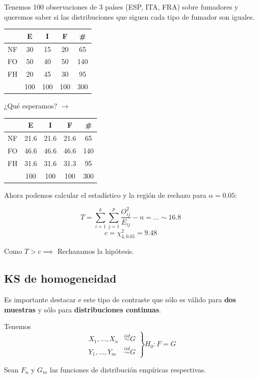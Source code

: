 

\begin{example}

Tenemos 100 observaciones de 3 países (ESP, ITA, FRA) sobre fumadores y queremos saber si las distribuciones que siguen cada tipo de fumador son iguales.

\begin{center}


\begin{tabular}{c|ccc|c}
 & E & I & F & \#\\\hline
NF&30&15&20&65\\
FO&50&40&50&140\\
FH&20&45&30&95\\\hline
&100 & 100 & 100 & 300
\end{tabular}
¿Qué esperamos? $\to$
\begin{tabular}{c|ccc|c}
 & E & I & F & \#\\\hline
NF & 21.6 & 21.6 & 21.6 & 65 \\
FO & 46.6 & 46.6 & 46.6 & 140 \\
FH & 31.6 & 31.6 & 31.3 & 95 \\
\hline
&100 & 100 & 100 & 300
\end{tabular}
\end{center}

Ahora podemos calcular el estadístico y la región de rechazo para $α=0.05$:

\[ T = \sum_{i=1}^k \sum_{j=1}^p \frac{O_{ij}^2}{E_{ij}} -n = ... \sim 16.8\]
\[ c = \chi^2_{4,0.05} = 9.48\]

Como $T > c \implies $ Rechazamos la hipótesis.

\end{example}

\subsection{KS de homogeneidad}

Es importante destacar e este tipo de contraste que sólo es válido para \textbf{dos muestras} y sólo para \textbf{distribuciones continuas}.

Tenemos \[
\left.
\begin{array}{cc}
X_{1} ,...,X_{n} &\overset{iid}{\sim} G\\ 
Y_{1} ,...,Y_m &\overset{iid}{\sim}G
\end{array} \right\} H_0 : F = G
\]

Sean $F_n$ y $G_m$ las funciones de distribución empíricas respectivas.

